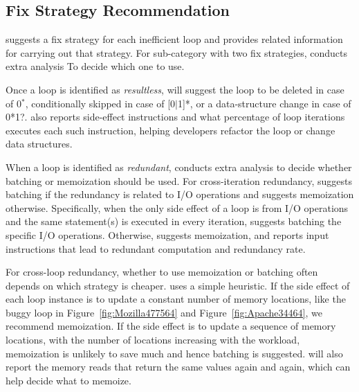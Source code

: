 \subsection{Fix Strategy Recommendation}
\label{sec:redundant_fix}

{\color{red}
\Tool suggests a fix strategy for each inefficient loop and provides
related information for carrying out that strategy. 
For sub-category with two fix strategies, \Tool conducts extra analysis
To decide which one to use. 
}


Once a loop is identified as \emph{resultless}, \Tool will suggest
the loop to be deleted in case of 0$^*$,
conditionally skipped in case of [0$|$1]*, or a
data-structure change in case of 0*1?.
\Tool also reports side-effect instructions 
and what percentage of loop iterations executes each such instruction,
helping developers refactor the loop or change data structures. 

When a loop is identified as \emph{redundant}, \Tool conducts
extra analysis to
decide whether batching or memoization should be used. 
For cross-iteration redundancy, \Tool suggests batching if the
redundancy is related to I/O operations and suggests memoization otherwise.
Specifically, when the only side effect of a loop is from I/O operations
and the same statement(s) is executed in every iteration, \Tool suggests
batching the specific I/O operations.
Otherwise, \Tool suggests memoization, and reports
input instructions that lead to redundant computation and redundancy rate.

For cross-loop redundancy, whether to use memoization or batching often
depends on which strategy is cheaper.
\Tool uses a simple
heuristic. If 
the side effect of each loop instance is to update 
a constant number of memory locations, like the 
buggy loop in Figure~\ref{fig:Mozilla477564} and Figure~\ref{fig:Apache34464}, 
we recommend memoization. If the side effect is to update
a sequence of memory locations, with the number of locations increasing
with the workload, memoization is unlikely to save much and
hence batching is suggested.
\Tool will also report
the memory reads that return the same values
again and again, which can help decide what to memoize.

